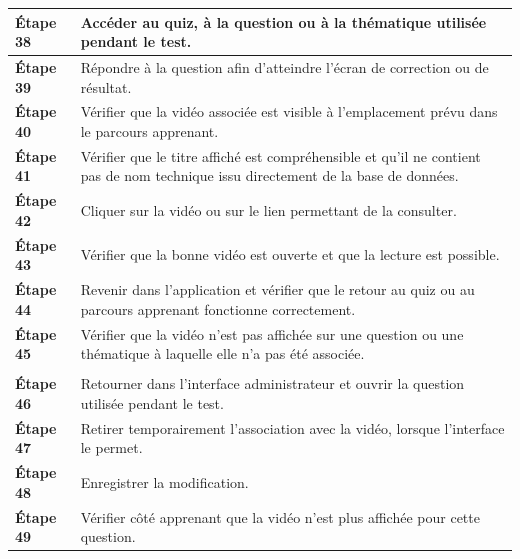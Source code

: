 \begin{longtable}{
    |>{\raggedright\arraybackslash}p{}
    |>{\raggedright\arraybackslash}p{}|
}
\textbf{Étape 38}
&
Accéder au quiz, à la question ou à la thématique utilisée pendant le test.
\\
\hline

\textbf{Étape 39}
&
Répondre à la question afin d'atteindre l'écran de correction ou de
résultat.
\\
\hline

\textbf{Étape 40}
&
Vérifier que la vidéo associée est visible à l'emplacement prévu dans le
parcours apprenant.
\\
\hline

\textbf{Étape 41}
&
Vérifier que le titre affiché est compréhensible et qu'il ne contient pas
de nom technique issu directement de la base de données.
\\
\hline

\textbf{Étape 42}
&
Cliquer sur la vidéo ou sur le lien permettant de la consulter.
\\
\hline

\textbf{Étape 43}
&
Vérifier que la bonne vidéo est ouverte et que la lecture est possible.
\\
\hline

\textbf{Étape 44}
&
Revenir dans l'application et vérifier que le retour au quiz ou au parcours
apprenant fonctionne correctement.
\\
\hline

\textbf{Étape 45}
&
Vérifier que la vidéo n'est pas affichée sur une question ou une thématique
à laquelle elle n'a pas été associée.
\\
\hline


\rowcolor{orange!50}
\multicolumn{2}{|c|}{
    \textbf{Modification et suppression de l'association}
}
\\
\hline

\textbf{Étape 46}
&
Retourner dans l'interface administrateur et ouvrir la question utilisée
pendant le test.
\\
\hline

\textbf{Étape 47}
&
Retirer temporairement l'association avec la vidéo, lorsque l'interface le
permet.
\\
\hline

\textbf{Étape 48}
&
Enregistrer la modification.
\\
\hline

\textbf{Étape 49}
&
Vérifier côté apprenant que la vidéo n'est plus affichée pour cette
question.
\\
\hline


\end{longtable}
